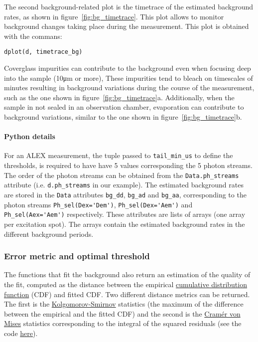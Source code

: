 The second background-related plot is the timetrace of the estimated background rates, 
as shown in figure~\ref{fig:bg_timetrace}. This plot allows to monitor background changes
taking place during the measurement. This plot is obtained with the commans:

\begin{lstlisting}
dplot(d, timetrace_bg)
\end{lstlisting}

Coverglass impurities can contribute to the background even when focusing 
deep into the sample (10μm or more),
These impurities tend to bleach on timescales of minutes resulting in
background variations during the course of the measurement, such as
the one shown in figure~\ref{fig:bg_timetrace}a.
Additionally, when the sample in not sealed in an observation chamber,
evaporation can contribute to background variations, similar to the
one shown in figure~\ref{fig:bg_timetrace}b.

\paragraph{Python details} For an ALEX measurement, the tuple passed to
\verb|tail_min_us| to define the thresholds, is required to have have 
5 values corresponding the 5 photon streams. 
The order of the photon streams can be obtained from
the \verb|Data.ph_streams| attribute (i.e. \verb|d.ph_streams| in our example).
The estimated background rates are stored in the \verb|Data| attributes
\verb|bg_dd|, \verb|bg_ad| and \verb|bg_aa|, corresponding to the photon
streams \verb|Ph_sel(Dex='Dem')|, \verb|Ph_sel(Dex='Aem')| and \verb|Ph_sel(Aex='Aem')|
respectively. These attributes are lists of arrays (one array per excitation spot).
The arrays contain the estimated background rates in the different background periods.

\subsubsection{Error metric and optimal threshold}

The functions that fit the background also return an estimation of the
quality of the fit, computed as the distance between the empirical
\href{http://en.wikipedia.org/wiki/Cumulative\_distribution\_function}{cumulative distribution function}
(CDF) and fitted CDF. Two different distance metrics can be returned.
The first is the
\href{http://en.wikipedia.org/wiki/Kolmogorov\%E2\%80\%93Smirnov\_test}{Kolgomorov-Smirnov}
statistics (the maximum of the difference between the empirical and the
fitted CDF) and the second is the
\href{http://en.wikipedia.org/wiki/Cram\%C3\%A9r\%E2\%80\%93von\_Mises\_criterion}{Cramér von Mises}
statistics corresponding to the integral of the squared residuals
(see the code
\href{https://github.com/tritemio/FRETBursts/blob/master/fretbursts/background.py#L41}{here}).

